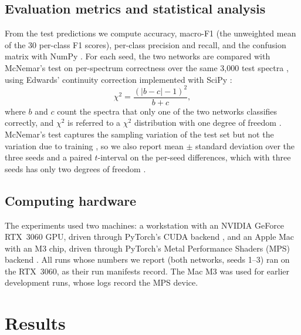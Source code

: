 \documentclass[journal,onecolumn]{IEEEtran}
\begin{document}
\subsection{Evaluation metrics and statistical analysis}
\label{sec:models-stats}
From the test predictions we compute accuracy, macro-F1 (the unweighted
mean of the 30 per-class F1 scores), per-class precision and recall, and the
confusion matrix with NumPy \cite{harris2020array}. For each seed, the two
networks are compared with McNemar's test on per-spectrum correctness over
the same 3{,}000 test spectra \cite{mcnemar1947note,dietterich1998approximate},
using Edwards' continuity correction \cite{edwards1948note} implemented with SciPy \cite{virtanen2020scipy}:
\begin{equation}
  \chi^2 = \frac{(\lvert b-c\rvert-1)^2}{b+c},
  \label{eq:mcnemar}
\end{equation}
where $b$ and $c$ count the spectra that only one of the two networks
classifies correctly, and $\chi^2$ is referred to a $\chi^2$ distribution
with one degree of freedom \cite{mcnemar1947note}. McNemar's test captures
the sampling variation of the test set but not the variation due to
training \cite{dietterich1998approximate}, so we also report mean $\pm$
standard deviation over the three seeds and a paired $t$-interval on the
per-seed differences, which with three seeds has only two degrees of
freedom \cite{dietterich1998approximate}.

\subsection{Computing hardware}
\label{sec:models-hardware}
The experiments used two machines: a workstation with an NVIDIA GeForce
RTX~3060 GPU, driven through PyTorch's CUDA backend
\cite{paszke2019pytorch}, and an Apple Mac with an M3 chip, driven through
PyTorch's Metal Performance Shaders (MPS) backend \cite{pytorchmps}. All
runs whose numbers we report (both networks, seeds 1--3) ran on the
RTX~3060, as their run manifests record. The Mac M3 was used for earlier
development runs, whose logs record the MPS device.

\section{Results}
\label{sec:results}
\end{document}
